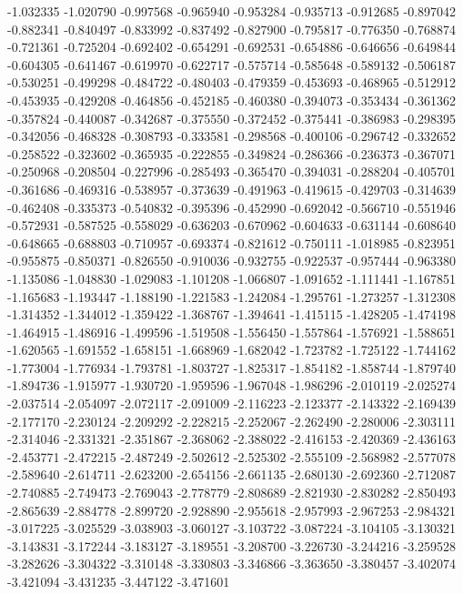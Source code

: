 -1.032335
-1.020790
-0.997568
-0.965940
-0.953284
-0.935713
-0.912685
-0.897042
-0.882341
-0.840497
-0.833992
-0.837492
-0.827900
-0.795817
-0.776350
-0.768874
-0.721361
-0.725204
-0.692402
-0.654291
-0.692531
-0.654886
-0.646656
-0.649844
-0.604305
-0.641467
-0.619970
-0.622717
-0.575714
-0.585648
-0.589132
-0.506187
-0.530251
-0.499298
-0.484722
-0.480403
-0.479359
-0.453693
-0.468965
-0.512912
-0.453935
-0.429208
-0.464856
-0.452185
-0.460380
-0.394073
-0.353434
-0.361362
-0.357824
-0.440087
-0.342687
-0.375550
-0.372452
-0.375441
-0.386983
-0.298395
-0.342056
-0.468328
-0.308793
-0.333581
-0.298568
-0.400106
-0.296742
-0.332652
-0.258522
-0.323602
-0.365935
-0.222855
-0.349824
-0.286366
-0.236373
-0.367071
-0.250968
-0.208504
-0.227996
-0.285493
-0.365470
-0.394031
-0.288204
-0.405701
-0.361686
-0.469316
-0.538957
-0.373639
-0.491963
-0.419615
-0.429703
-0.314639
-0.462408
-0.335373
-0.540832
-0.395396
-0.452990
-0.692042
-0.566710
-0.551946
-0.572931
-0.587525
-0.558029
-0.636203
-0.670962
-0.604633
-0.631144
-0.608640
-0.648665
-0.688803
-0.710957
-0.693374
-0.821612
-0.750111
-1.018985
-0.823951
-0.955875
-0.850371
-0.826550
-0.910036
-0.932755
-0.922537
-0.957444
-0.963380
-1.135086
-1.048830
-1.029083
-1.101208
-1.066807
-1.091652
-1.111441
-1.167851
-1.165683
-1.193447
-1.188190
-1.221583
-1.242084
-1.295761
-1.273257
-1.312308
-1.314352
-1.344012
-1.359422
-1.368767
-1.394641
-1.415115
-1.428205
-1.474198
-1.464915
-1.486916
-1.499596
-1.519508
-1.556450
-1.557864
-1.576921
-1.588651
-1.620565
-1.691552
-1.658151
-1.668969
-1.682042
-1.723782
-1.725122
-1.744162
-1.773004
-1.776934
-1.793781
-1.803727
-1.825317
-1.854182
-1.858744
-1.879740
-1.894736
-1.915977
-1.930720
-1.959596
-1.967048
-1.986296
-2.010119
-2.025274
-2.037514
-2.054097
-2.072117
-2.091009
-2.116223
-2.123377
-2.143322
-2.169439
-2.177170
-2.230124
-2.209292
-2.228215
-2.252067
-2.262490
-2.280006
-2.303111
-2.314046
-2.331321
-2.351867
-2.368062
-2.388022
-2.416153
-2.420369
-2.436163
-2.453771
-2.472215
-2.487249
-2.502612
-2.525302
-2.555109
-2.568982
-2.577078
-2.589640
-2.614711
-2.623200
-2.654156
-2.661135
-2.680130
-2.692360
-2.712087
-2.740885
-2.749473
-2.769043
-2.778779
-2.808689
-2.821930
-2.830282
-2.850493
-2.865639
-2.884778
-2.899720
-2.928890
-2.955618
-2.957993
-2.967253
-2.984321
-3.017225
-3.025529
-3.038903
-3.060127
-3.103722
-3.087224
-3.104105
-3.130321
-3.143831
-3.172244
-3.183127
-3.189551
-3.208700
-3.226730
-3.244216
-3.259528
-3.282626
-3.304322
-3.310148
-3.330803
-3.346866
-3.363650
-3.380457
-3.402074
-3.421094
-3.431235
-3.447122
-3.471601

